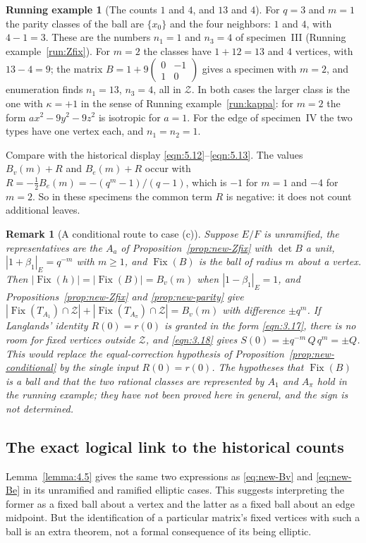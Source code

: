 \documentclass[12pt,letterpaper]{amsart}
\numberwithin{equation}{section}
\newtheorem{draftremark}{Remark}
\theoremstyle{definition}
\newtheorem{runex}[theorem]{Running example}
\theoremstyle{plain}
\newcommand{\smat}[4]{\left(\begin{smallmatrix}#1&#2\\#3&#4\end{smallmatrix}\right)}
\begin{document}
\begin{runex}[The counts $1$ and $4$, and $13$ and $4$]
\label{run:parity}
For $q=3$ and $m=1$ the parity classes of the ball are $\{x_0\}$ and
the four neighbors: $1$ and $4$, with $4-1=3$. These are the numbers
$n_1=1$ and $n_3=4$ of specimen~III
(Running example~\ref{run:Zfix}). For $m=2$ the classes have
$1+12=13$ and $4$ vertices, with $13-4=9$; the matrix
$B=1+9\smat{0}{-1}{1}{0}$ gives a specimen with $m=2$, and enumeration
finds $n_1=13$, $n_3=4$, all in $\mathcal Z$. In both cases the larger
class is the one with $\kappa=+1$ in the sense of
Running example~\ref{run:kappa}: for $m=2$ the form
$ax^2-9y^2-9z^2$ is isotropic for $a=1$. For the edge of
specimen~IV the two types have one vertex each, and $n_1=n_2=1$.

Compare with the historical display \eqref{eqn:5.12}--\eqref{eqn:5.13}.
The values $B_v(m)+R$ and $B_e(m)+R$ occur with
$R=-\tfrac12B_e(m)=-(q^m-1)/(q-1)$, which is $-1$ for $m=1$ and $-4$
for $m=2$. So in these specimens the common term $R$ is negative: it
does not count additional leaves.
\end{runex}

\begin{draftremark}[A conditional route to case (c)]
\label{rem:route-c}
Suppose $E/F$ is unramified, the representatives are the $A_a$ of
Proposition~\ref{prop:new-Zfix} with $\det B$ a unit,
$|1+\beta_1|_E=q^{-m}$ with $m\geq1$, and
$\operatorname{Fix}(B)$ is the ball of radius $m$ about a vertex.
Then $|\operatorname{Fix}(h)|=|\operatorname{Fix}(B)|=B_v(m)$ when
$|1-\beta_1|_E=1$, and Propositions~\ref{prop:new-Zfix} and
\ref{prop:new-parity} give
$|\operatorname{Fix}(T_{A_1})\cap\mathcal Z|
+|\operatorname{Fix}(T_{A_\pi})\cap\mathcal Z|=B_v(m)$
with difference $\pm q^m$. If Langlands' identity $R(0)=r(0)$ is
granted in the form \eqref{eqn:3.17}, there is no room for fixed
vertices outside $\mathcal Z$, and \eqref{eqn:3.18} gives
$S(0)=\pm q^{-m}\,Q\,q^m=\pm Q$. This would replace the
equal-correction hypothesis of Proposition~\ref{prop:new-conditional}
by the single input $R(0)=r(0)$. The hypotheses that
$\operatorname{Fix}(B)$ is a ball and that the two rational classes
are represented by $A_1$ and $A_\pi$ hold in the running example;
they have not been proved here in general, and the sign is not
determined.
\end{draftremark}

\subsection{The exact logical link to the historical counts}
Lemma~\ref{lemma:4.5} gives the same two expressions as
\eqref{eq:new-Bv} and \eqref{eq:new-Be} in its unramified
and ramified elliptic cases. This suggests interpreting the
former as a fixed ball about a vertex and the latter as a fixed
ball about an edge midpoint. But the identification of a particular
matrix's fixed vertices with such a ball is an extra theorem,
not a formal consequence of its being elliptic.
\end{document}
